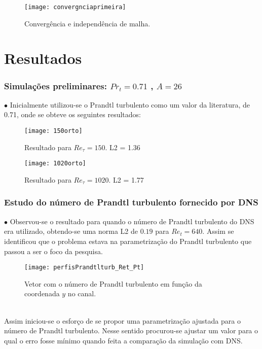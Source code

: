 \documentclass[xcolor=dvipsnames,10pt,aspectratio=169]{beamer}
\begin{document}
	
	
	
	
			\begin{frame}
		\begin{figure}
			\centering
			\texttt{[image: convergnciaprimeira]}
			\caption{Convergência e independência de malha.}
			\label{convergencia}
		\end{figure}
	\end{frame}
		
	
	
	
		
	\section{Resultados}
		\begin{frame}
			\frametitle{Simulações preliminares: $Pr_t= 0.71$ , $A = 26 $}
				$\bullet$ Inicialmente utilizou-se o Prandtl turbulento como um valor da literatura, de 0.71, onde se obteve os seguintes resultados:\\
			\begin{minipage}[h!]{0.45\textwidth}
			\begin{figure}
				\centering
				\texttt{[image: 150orto]}
				\caption{Resultado para $Re_\tau = 150$. L2 = 1.36 }
			\end{figure}
			\end{minipage}\hfill
				\begin{minipage}[h!]{0.45\textwidth}
				\begin{figure}
					\centering
					\texttt{[image: 1020orto]}
					\caption{Resultado para $Re_\tau = 1020$. L2 = 1.77}
				\end{figure}
			\end{minipage}		
		\end{frame}
	
	
	
	
		
		\begin{frame}
		\frametitle{Estudo do número de Prandtl turbulento fornecido por DNS}
		\begin{minipage}[h!]{0.45\textwidth}
			$\bullet$ Observou-se o resultado para quando o número de Prandtl turbulento do DNS era utilizado, obtendo-se uma norma L2 de $0.19$ para $Re_t = 640$. Assim se identificou que o problema estava na parametrização do Prandtl turbulento que passou a ser o foco da pesquisa. 
		\end{minipage}\hfill
		\begin{minipage}[h!]{0.45\textwidth}
			\begin{figure}
				\centering
				\texttt{[image: perfisPrandtlturb\_Ret\_Pt]}
				\caption{Vetor com o número de Prandtl turbulento em função da coordenada $ y $ no canal.}
			\end{figure}
		\end{minipage}	\\
		Assim iniciou-se o esforço de se propor uma parametrização ajustada para o número de Prandtl turbulento.
		Nesse sentido procurou-se ajustar um valor para o qual o erro fosse mínimo quando feita a comparação da simulação com DNS.
		\end{frame}
	
\end{document}
